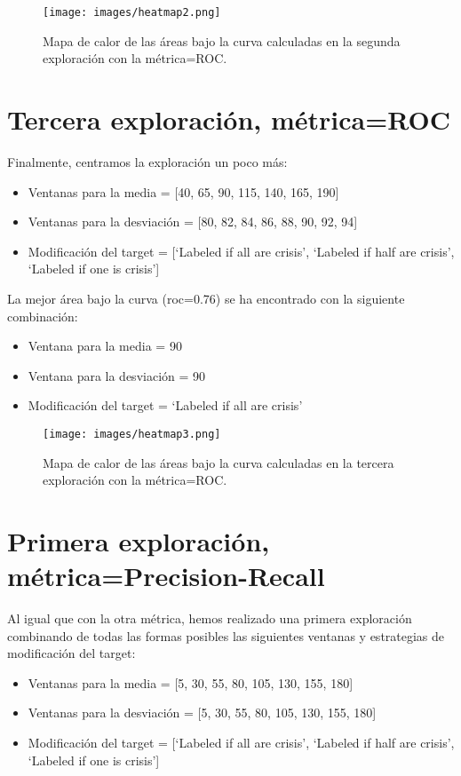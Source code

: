 \documentclass[a4paper,12pt,twoside,oldfontcommands]{memoir}
\begin{document}
	\begin{figure}
		\centering
		\texttt{[image: images/heatmap2.png]}
		\caption{Mapa de calor de las áreas bajo la curva calculadas en la segunda exploración con la métrica=ROC.}
		\label{fig:heatmap2}
	\end{figure}
	
	\section{Tercera exploración, métrica=ROC}
	Finalmente, centramos la exploración un poco más: 
	\begin{itemize}
		\item Ventanas para la media = [40, 65, 90, 115, 140, 165, 190]
		\item Ventanas para la desviación = [80, 82, 84, 86, 88, 90, 92, 94]
		\item Modificación del target = [`Labeled if all are crisis', `Labeled if half are crisis', `Labeled if one is crisis']
	\end{itemize}
	
	La mejor área bajo la curva (roc=0.76) se ha encontrado con la siguiente combinación: 
	\begin{itemize}
		\item Ventana para la media = 90
		\item Ventana para la desviación = 90
		\item Modificación del target = `Labeled if all are crisis'
	\end{itemize}
	
	\begin{figure}
		\centering
		\texttt{[image: images/heatmap3.png]}
		\caption{Mapa de calor de las áreas bajo la curva calculadas en la tercera exploración con la métrica=ROC.}
		\label{fig:heatmap3}
	\end{figure}
	
	\section{Primera exploración, métrica=Precision-Recall}
	
	Al igual que con la otra métrica, hemos realizado una primera exploración combinando de todas las formas posibles las siguientes ventanas y estrategias de modificación del target: 
	\begin{itemize}
		\item Ventanas para la media = [5, 30, 55, 80, 105, 130, 155, 180]
		\item Ventanas para la desviación = [5, 30, 55, 80, 105, 130, 155, 180]
		\item Modificación del target = [`Labeled if all are crisis', `Labeled if half are crisis', `Labeled if one is crisis']
	\end{itemize}
	
\end{document}
